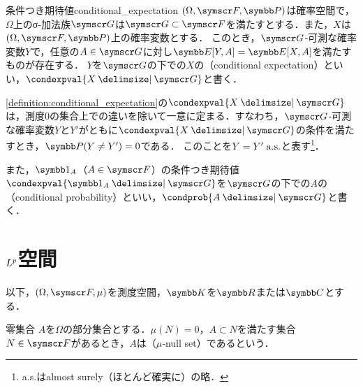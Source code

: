 \documentclass[../../main]{subfiles}
\begin{document}
\begin{definition}{条件つき期待値}{conditional_expectation}
  \((\Omega,\sigmaalg{F},\prob)\)は確率空間で，\(\Omega\)上のσ‐加法族\(\sigmaalg{G}\)は\(\sigmaalg{G}\subset\sigmaalg{F}\)を満たすとする．また，\(X\)は\((\Omega,\sigmaalg{F},\prob)\)上の確率変数とする．
  このとき，\(\sigmaalg{G}\)‐可測な確率変数\(Y\)で，任意の\(A\in\sigmaalg{G}\)に対し\(\expval[Y,A]=\expval[X,A]\)を満たすものが存在する\footnotemark ．
  \(Y\)を\(\sigmaalg{G}\)の下での\(X\)の（conditional expectation）といい，\(\condexpval{X\given\sigmaalg{G}}\)と書く．
\end{definition}
\cref{definition:conditional_expectation}の\(\condexpval{X\given\sigmaalg{G}}\)は，測度\(0\)の集合上での違いを除いて一意に定まる．すなわち，\(\sigmaalg{G}\)‐可測な確率変数\(Y\)と\(Y'\)がともに\(\condexpval{X\given\sigmaalg{G}}\)の条件を満たすとき，\(\prob(Y\neq Y')=0\)である．
このことを\(Y=Y'\almostsurely\)と表す\footnote{a{.}s{.}はalmost surely（ほとんど確実に）の略．}．

また，\(\indicator_A\)（\(A\in\sigmaalg{F}\)）の条件つき期待値\(\condexpval{\indicator_A\given\sigmaalg{G}}\)を\(\sigmaalg{G}\)の下での\(A\)の（conditional probability）といい，\(\condprob{A\given\sigmaalg{G}}\)と書く．

\section{\texorpdfstring{\(\Lebesgue{p}\)空間}{Lp空間}}

以下，\((\Omega,\sigmaalg{F},\mu)\)を測度空間，\(\numset{K}\)を\(\numset{R}\)または\(\numset{C}\)とする．

\begin{definition}{零集合}{}
  \(A\)を\(\Omega\)の部分集合とする．\(\mu(N)=0\)，\(A\subset N\)を満たす集合\(N\in\sigmaalg{F}\)があるとき，\(A\)は（\(\mu\)‐null set）であるという．
\end{definition}
\end{document}
